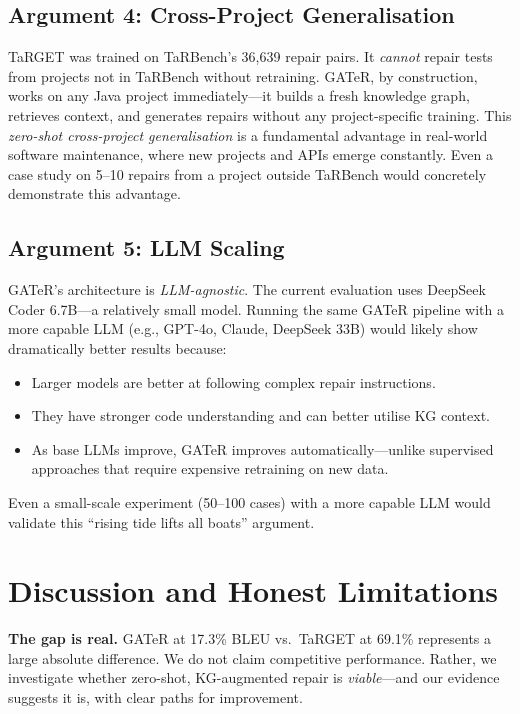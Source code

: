 \documentclass[conference,10pt]{IEEEtran}
\begin{document}
\subsection{Argument 4: Cross-Project Generalisation}

TaRGET was trained on TaRBench's 36{,}639 repair pairs.  It
\emph{cannot} repair tests from projects not in TaRBench without
retraining.  GATeR, by construction, works on any Java project
immediately---it builds a fresh knowledge graph, retrieves context,
and generates repairs without any project-specific training.  This
\emph{zero-shot cross-project generalisation} is a fundamental
advantage in real-world software maintenance, where new projects and
APIs emerge constantly.  Even a case study on 5--10 repairs from a
project outside TaRBench would concretely demonstrate this advantage.

\subsection{Argument 5: LLM Scaling}

GATeR's architecture is \emph{LLM-agnostic}.  The current evaluation
uses DeepSeek Coder 6.7B---a relatively small model.  Running the
same GATeR pipeline with a more capable LLM (e.g., GPT-4o, Claude,
DeepSeek 33B) would likely show dramatically better results because:
\begin{itemize}
  \item Larger models are better at following complex repair
        instructions.
  \item They have stronger code understanding and can better
        utilise KG context.
  \item As base LLMs improve, GATeR improves automatically---unlike
        supervised approaches that require expensive retraining on
        new data.
\end{itemize}

Even a small-scale experiment (50--100 cases) with a more capable LLM
would validate this ``rising tide lifts all boats'' argument.

\section{Discussion and Honest Limitations}
\label{sec:discussion}

\textbf{The gap is real.}  GATeR at 17.3\% BLEU vs.\ TaRGET at 69.1\%
represents a large absolute difference.  We do not claim competitive
performance.  Rather, we investigate whether zero-shot, KG-augmented
repair is \emph{viable}---and our evidence suggests it is, with clear
paths for improvement.
\end{document}
